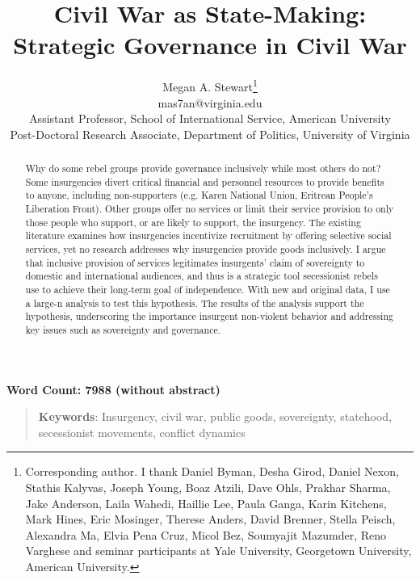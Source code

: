 \documentclass[12pt, letterpaper]{article}
\title{Civil War as State-Making: \\ Strategic Governance in Civil War}
\author{Megan A. Stewart\thanks{Corresponding author. I thank Daniel Byman, Desha Girod, Daniel Nexon, Stathis Kalyvas, Joseph Young, Boaz Atzili, Dave Ohls, Prakhar Sharma, Jake Anderson, Laila Wahedi, Haillie Lee, Paula Ganga, Karin Kitchens, Mark Hines, Eric Mosinger, Therese Anders, David Brenner, Stella Peisch, Alexandra Ma, Elvia Pena Cruz, Micol Bez, Soumyajit Mazumder, Reno Varghese and seminar participants at Yale University, Georgetown University, American University.}\\mas7an@virginia.edu\\\normalsize{Assistant Professor, School of International Service, American University}\\ \normalsize{Post-Doctoral Research Associate, Department of Politics, University of Virginia}}%
\date{}
\begin{document}
 
\maketitle
\doublespacing
\vspace{.3in}
\begin{center}
\noindent\textbf{Word Count: 7988 (without abstract)}
\end{center}
\begin{singlespace}
\begin{abstract}
\begin{normalsize}
\noindent Why do some rebel groups provide governance inclusively while most others do not? Some insurgencies divert critical financial and personnel resources to provide benefits to anyone, including non-supporters (e.g. Karen National Union, Eritrean People's Liberation Front). Other groups offer no services or limit their service provision to only those people who support, or are likely to support, the insurgency. The existing literature examines how insurgencies incentivize recruitment by offering selective social services, yet no research addresses why insurgencies provide goods inclusively. I argue that inclusive provision of services legitimates insurgents' claim of sovereignty to domestic and international audiences, and thus is a strategic tool secessionist rebels use to achieve their long-term goal of independence. With new and original data, I use a large-n analysis to test this hypothesis. The results of the analysis support the hypothesis, underscoring the importance insurgent non-violent behavior and addressing key issues such as sovereignty and governance.
\end{normalsize}
\end{abstract}

\begin{quote}
\textbf{Keywords}: Insurgency, civil war, public goods, sovereignty, statehood, secessionist movements, conflict dynamics
\end{quote}
\end{singlespace}



\end{document}
